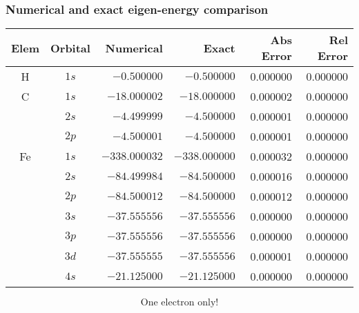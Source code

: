 \begin{frame}[t]
  \frametitle{Numerical and exact eigen-energy comparison}
  \footnotesize
  \centering
  \begin{tabular}{ c | c | r | r | r | r }
    \hline
  Elem & Orbital & Numerical & Exact & Abs Error & Rel Error \\ \hline \hline
    H &  $1s$  &  $-0.500000$  &  $-0.500000$  &  0.000000  &  0.000000 \\  \hline
    C &  $1s$  &  $-18.000002$  &  $-18.000000$  &  0.000002  &  0.000000 \\ 
      &  $2s$  &  $-4.499999$  &  $-4.500000$  &  0.000001  &  0.000000 \\ 
      &  $2p$  &  $-4.500001$  &  $-4.500000$  &  0.000001  &  0.000000 \\  \hline
  Fe &  $1s$  &  $-338.000032$  &  $-338.000000$  &  0.000032  &  0.000000 \\ 
      &  $2s$  &  $-84.499984$  &  $-84.500000$  &  0.000016  &  0.000000 \\ 
      &  $2p$  &  $-84.500012$  &  $-84.500000$  &  0.000012  &  0.000000 \\ 
      &  $3s$  &  $-37.555556$  &  $-37.555556$  &  0.000000  &  0.000000 \\ 
      &  $3p$  &  $-37.555556$  &  $-37.555556$  &  0.000000  &  0.000000 \\
      &  $3d$  &  $-37.555555$  &  $-37.555556$  &  0.000001  &  0.000000 \\
      &  $4s$  &  $-21.125000$  &  $-21.125000$  &  0.000000  &  0.000000 \\
    \hline
  \end{tabular}
  
  \emph{\[\boxed{\text{One electron only!}}\]}
\end{frame}
